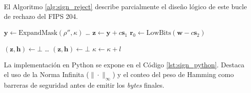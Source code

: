 \documentclass[11pt, a4paper]{report}
\theoremstyle{definition}
\begin{document}
El Algoritmo \ref{alg:sign_reject} describe parcialmente el diseño lógico de este bucle de rechazo del FIPS 204.

\begin{algorithm}[H]
\caption{Fragmento Algoritmo 7: Bucle de Muestreo por Rechazo}
\label{alg:sign_reject}
\begin{algorithmic}[1]
    \STATE $\mathbf{y} \gets \text{ExpandMask}(\rho'', \kappa)$
    \STATE \dots {}
    \STATE $\mathbf{z} \gets \mathbf{y} + c \mathbf{s}_1$
    \STATE $\mathbf{r}_0 \gets \text{LowBits}(\mathbf{w} - c \mathbf{s}_2)$
    
        \STATE $(\mathbf{z}, \mathbf{h}) \gets \bot$ 
    \ELSE
        \STATE \dots {}
            \STATE $(\mathbf{z}, \mathbf{h}) \gets \bot$ 
        \ENDIF
    \ENDIF
    \STATE $\kappa \gets \kappa + l$ 
\ENDWHILE
\end{algorithmic}
\end{algorithm}

La implementación en Python se expone en el Código \ref{lst:sign_python}. Destaca el uso de la Norma Infinita ($\|\cdot\|_\infty$) y el conteo del peso de Hamming como barreras de seguridad antes de emitir los \textit{bytes} finales.
\end{document}
